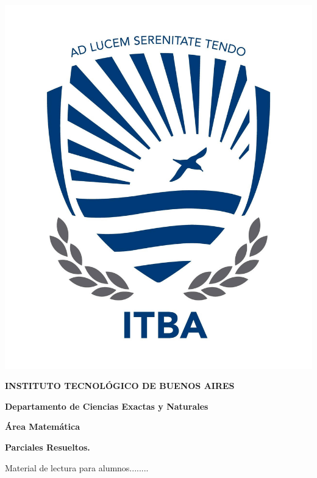 \documentclass[10pt, a4paper]{report}
\begin{document}
    \begin{center}

        \thispagestyle{empty}  %

        \includegraphics[scale=0.2]{../figs/logoitba2.png}
        \medskip
        
        \textbf{\large{INSTITUTO  TECNOL\'OGICO DE BUENOS AIRES}\normalsize}
        
        \smallskip
        
        \textbf{\large  Departamento de Ciencias Exactas y Naturales}
        
        \smallskip
        \textbf{\large \'Area  Matem\'atica}
      
        \vspace{2 cm}
        
        \textbf{\Large \noindent \textbf{Parciales Resueltos.}}
             
        \vspace{1.5cm}
        
        \large  Material de lectura para alumnos........  \normalsize
    \end{center}
    
\end{document}
